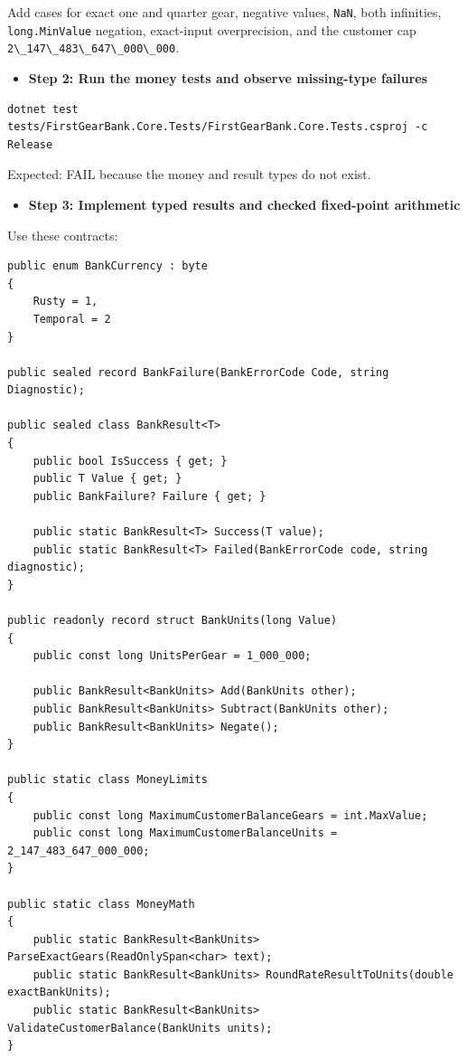 \documentclass[
  10pt,
  letterpaper,
]{article}
\newcommand{\passthrough}[1]{#1}
\providecommand{\tightlist}{%
  \setlength{\itemsep}{0pt}\setlength{\parskip}{0pt}}
\begin{document}
Add cases for exact one and quarter gear, negative values,
\passthrough{\lstinline!NaN!}, both infinities,
\passthrough{\lstinline!long.MinValue!} negation, exact-input
overprecision, and the customer cap
\passthrough{\lstinline!2\_147\_483\_647\_000\_000!}.

\begin{itemize}
\tightlist
\item[$\square$]
  \textbf{Step 2: Run the money tests and observe missing-type failures}
\end{itemize}

\begin{lstlisting}
dotnet test tests/FirstGearBank.Core.Tests/FirstGearBank.Core.Tests.csproj -c Release
\end{lstlisting}

Expected: FAIL because the money and result types do not exist.

\begin{itemize}
\tightlist
\item[$\square$]
  \textbf{Step 3: Implement typed results and checked fixed-point
  arithmetic}
\end{itemize}

Use these contracts:

\begin{lstlisting}
public enum BankCurrency : byte
{
    Rusty = 1,
    Temporal = 2
}

public sealed record BankFailure(BankErrorCode Code, string Diagnostic);

public sealed class BankResult<T>
{
    public bool IsSuccess { get; }
    public T Value { get; }
    public BankFailure? Failure { get; }

    public static BankResult<T> Success(T value);
    public static BankResult<T> Failed(BankErrorCode code, string diagnostic);
}

public readonly record struct BankUnits(long Value)
{
    public const long UnitsPerGear = 1_000_000;

    public BankResult<BankUnits> Add(BankUnits other);
    public BankResult<BankUnits> Subtract(BankUnits other);
    public BankResult<BankUnits> Negate();
}

public static class MoneyLimits
{
    public const long MaximumCustomerBalanceGears = int.MaxValue;
    public const long MaximumCustomerBalanceUnits = 2_147_483_647_000_000;
}

public static class MoneyMath
{
    public static BankResult<BankUnits> ParseExactGears(ReadOnlySpan<char> text);
    public static BankResult<BankUnits> RoundRateResultToUnits(double exactBankUnits);
    public static BankResult<BankUnits> ValidateCustomerBalance(BankUnits units);
}
\end{lstlisting}
\end{document}
